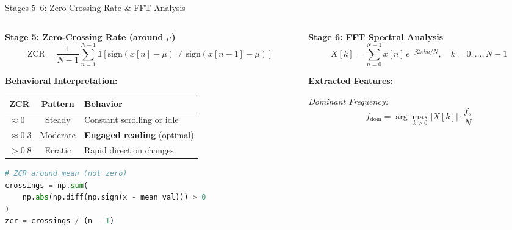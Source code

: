 \documentclass[aspectratio=169,10pt]{beamer}
\begin{document}
\begin{frame}{Stages 5--6: Zero-Crossing Rate \& FFT Analysis}
\begin{columns}[T]
\begin{column}{0.48\textwidth}
\textbf{Stage 5: Zero-Crossing Rate (around $\mu$)}
\begin{equation*}
\text{ZCR} = \frac{1}{N{-}1}\sum_{n=1}^{N-1} \mathbb{1}\!\left[\text{sign}(x[n]{-}\mu) \neq \text{sign}(x[n{-}1]{-}\mu)\right]
\end{equation*}

\vspace{4pt}
\footnotesize
\textbf{Behavioral Interpretation:}

\vspace{2pt}
\begin{tabular}{@{}lcl@{}}
\toprule
\textbf{ZCR} & \textbf{Pattern} & \textbf{Behavior} \\
\midrule
$\approx 0$ & Steady & Constant scrolling or idle \\
$\approx 0.3$ & Moderate & \textbf{Engaged reading} (optimal) \\
$> 0.8$ & Erratic & Rapid direction changes \\
\bottomrule
\end{tabular}

\vspace{6pt}
\begin{lstlisting}[language=Python]
# ZCR around mean (not zero)
crossings = np.sum(
    np.abs(np.diff(np.sign(x - mean_val))) > 0
)
zcr = crossings / (n - 1)
\end{lstlisting}
\end{column}

\begin{column}{0.48\textwidth}
\textbf{Stage 6: FFT Spectral Analysis}
\begin{equation*}
X[k] = \sum_{n=0}^{N-1} x[n]\, e^{-j2\pi kn/N}, \quad k = 0, \ldots, N{-}1
\end{equation*}

\vspace{4pt}
\footnotesize
\textbf{Extracted Features:}

\vspace{2pt}
\textit{Dominant Frequency:}
\begin{equation*}
f_{\text{dom}} = \arg\max_{k>0} |X[k]| \cdot \frac{f_s}{N}
\end{equation*}


\end{column}
\end{columns}
\end{frame}
\end{document}

